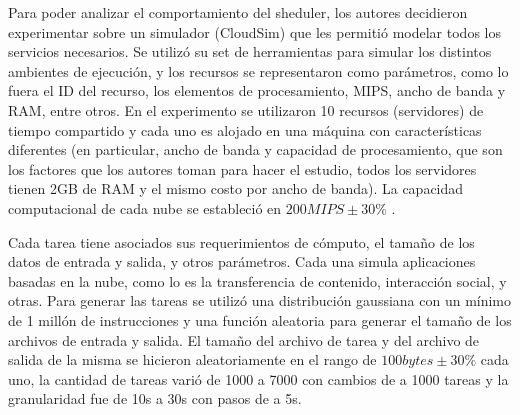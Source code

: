 Para poder analizar el comportamiento del sheduler, los autores decidieron experimentar sobre un simulador (CloudSim) que les permitió modelar todos los servicios necesarios. Se utilizó su set de herramientas para simular los distintos ambientes de ejecución, y los recursos se representaron como parámetros, como lo fuera el ID del recurso, los elementos de procesamiento, MIPS,  ancho de banda y RAM, entre otros. 
En el experimento se utilizaron 10 recursos (servidores) de tiempo compartido y cada uno es alojado en una máquina con características diferentes (en particular, ancho de banda y capacidad de procesamiento, que son los factores que los autores toman para hacer el estudio, todos los servidores tienen 2GB de RAM y el mismo costo por ancho de banda). La capacidad computacional de cada nube se estableció en $200 MIPS \pm 30\%$ .

Cada tarea tiene asociados sus requerimientos de cómputo, el tamaño de los datos de entrada y salida, y otros parámetros. Cada una simula aplicaciones basadas en la nube, como lo es la transferencia de contenido, interacción social, y otras. Para generar las tareas se utilizó una distribución gaussiana con un mínimo de 1 millón de instrucciones y una función aleatoria para generar el tamaño de los archivos de entrada y salida. El tamaño del archivo de tarea y del archivo de salida de la misma se hicieron aleatoriamente en el rango de $100 bytes \pm 30\%$  cada uno, la cantidad de tareas varió de 1000 a 7000 con cambios de a 1000 tareas y la granularidad fue de 10s a 30s con pasos de a 5s.
